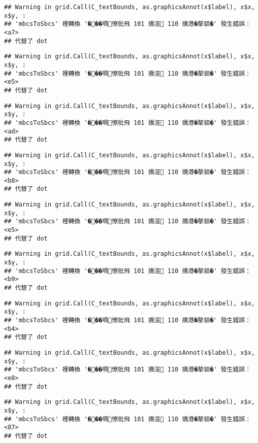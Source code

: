 \documentclass[
]{article}
\begin{document}
\begin{verbatim}
## Warning in grid.Call(C_textBounds, as.graphicsAnnot(x$label), x$x, x$y, :
## 'mbcsToSbcs' 裡轉換 '���啁憭批飛 101 撟渲 110 撟港�摮貊�' 發生錯誤：<a7>
## 代替了 dot
\end{verbatim}

\begin{verbatim}
## Warning in grid.Call(C_textBounds, as.graphicsAnnot(x$label), x$x, x$y, :
## 'mbcsToSbcs' 裡轉換 '���啁憭批飛 101 撟渲 110 撟港�摮貊�' 發生錯誤：<e5>
## 代替了 dot
\end{verbatim}

\begin{verbatim}
## Warning in grid.Call(C_textBounds, as.graphicsAnnot(x$label), x$x, x$y, :
## 'mbcsToSbcs' 裡轉換 '���啁憭批飛 101 撟渲 110 撟港�摮貊�' 發生錯誤：<ad>
## 代替了 dot
\end{verbatim}

\begin{verbatim}
## Warning in grid.Call(C_textBounds, as.graphicsAnnot(x$label), x$x, x$y, :
## 'mbcsToSbcs' 裡轉換 '���啁憭批飛 101 撟渲 110 撟港�摮貊�' 發生錯誤：<b8>
## 代替了 dot
\end{verbatim}

\begin{verbatim}
## Warning in grid.Call(C_textBounds, as.graphicsAnnot(x$label), x$x, x$y, :
## 'mbcsToSbcs' 裡轉換 '���啁憭批飛 101 撟渲 110 撟港�摮貊�' 發生錯誤：<e5>
## 代替了 dot
\end{verbatim}

\begin{verbatim}
## Warning in grid.Call(C_textBounds, as.graphicsAnnot(x$label), x$x, x$y, :
## 'mbcsToSbcs' 裡轉換 '���啁憭批飛 101 撟渲 110 撟港�摮貊�' 發生錯誤：<b9>
## 代替了 dot
\end{verbatim}

\begin{verbatim}
## Warning in grid.Call(C_textBounds, as.graphicsAnnot(x$label), x$x, x$y, :
## 'mbcsToSbcs' 裡轉換 '���啁憭批飛 101 撟渲 110 撟港�摮貊�' 發生錯誤：<b4>
## 代替了 dot
\end{verbatim}

\begin{verbatim}
## Warning in grid.Call(C_textBounds, as.graphicsAnnot(x$label), x$x, x$y, :
## 'mbcsToSbcs' 裡轉換 '���啁憭批飛 101 撟渲 110 撟港�摮貊�' 發生錯誤：<e8>
## 代替了 dot
\end{verbatim}

\begin{verbatim}
## Warning in grid.Call(C_textBounds, as.graphicsAnnot(x$label), x$x, x$y, :
## 'mbcsToSbcs' 裡轉換 '���啁憭批飛 101 撟渲 110 撟港�摮貊�' 發生錯誤：<87>
## 代替了 dot
\end{verbatim}
\end{document}
